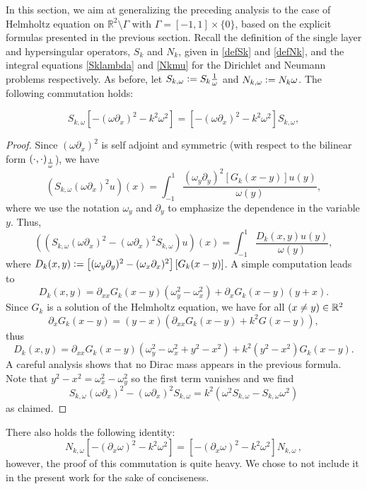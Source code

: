 \documentclass[a4paper]{subfiles}
\begin{document}
In this section, we aim at generalizing the preceding analysis to the case of Helmholtz equation on $\mathbb{R}^2\setminus \Gamma$ 
with $\Gamma = [-1,1]\times\{0\}$, based on the explicit formulas presented in the previous section. Recall the definition of the single layer and 
hypersingular operators, $S_k$ and $N_k$, given in \eqref{defSk} and \eqref{defNk}, and the integral equations \eqref{Sklambda} and 
\eqref{Nkmu} for the Dirichlet and Neumann problems respectively. As before, let $S_{k,\omega} \mathrel{\mathop:}= S_k \frac{1}{\omega}$ and 
$N_{k,\omega} \mathrel{\mathop:}= N_k \omega$. The following commutation holds:	
\begin{theorem}
	\label{commutations}
	\[S_{k,\omega} \left[-(\omega \partial_x)^2 - k^2\omega^2\right] =  \left[-(\omega \partial_x)^2 - k^2\omega^2\right]S_{k,\omega},\]
\end{theorem}
\begin{proof}
	Since $(\omega \partial_x)^2$ is self adjoint and symmetric (with respect to the bilinear form $\left( \cdot,\cdot\right)_{\frac{1}{\omega}}$), we have 
	\[\left(S_{k,\omega} (\omega \partial_x)^2 u\right)(x)= \int_{-1}^{1} \frac{(\omega_y \partial_y)^2 \left[G_k(x-y)\right] u(y)}{\omega(y)},\]
	where we use the notation $\omega_y$ and $\partial_y$ to emphasize the dependence in the variable $y$. 
	Thus, 
	\[\left(\left(S_{k,\omega} (\omega \partial_x)^2 - (\omega \partial_x)^2 S_{k,\omega}\right)u\right)(x) = \int_{-1}^{1} \frac{D_k(x,y)u(y)}{\omega(y)},\]
	where $D_k(x,y) \mathrel{\mathop:}= \left[(\omega_y \partial_y)^2 - (\omega_x \partial_x)^2\right] \left[G_k(x-y)\right]$. 
	A simple computation leads to 
	\[D_k(x,y) = \partial_{xx}G_k(x-y) (\omega^2_y - \omega^2_x) + \partial_x G_k(x-y)(y + x).\]
	Since $G_k$ is a solution of the Helmholtz equation, we have for all $(x \neq y) \in \mathbb{R}^2$ 
	\[\partial_x G_k(x-y) = (y-x)(\partial_{xx}G_k(x-y) + k^2G(x-y)),\]
	thus
	\[D_k(x,y) = \partial_{xx}G_k(x-y)\left(\omega^2_y - \omega_x^2 + y^2 - x^2\right) + k^2(y^2 - x^2)G_k(x-y) . \]
	A careful analysis shows that no Dirac mass appears in the previous formula.
	Note that $y^2 - x^2 = \omega_x^2 - \omega_y^2$ so the first term vanishes and we find
	\[S_{k,\omega} (\omega \partial_x)^2 - (\omega \partial_x)^2 S_{k,\omega} =  k^2\left(\omega^2 S_{k,\omega} -S_{k,\omega} \omega^2 \right)\]
	as claimed.
\end{proof}
There also holds the following identity:
\[N_{k,\omega} \left[-(\partial_x \omega)^2 - k^2\omega^2\right] =  \left[-(\partial_x \omega)^2 - k^2\omega^2\right]N_{k,\omega}\,,\]
however, the proof of this commutation is quite heavy. We chose to not include it in the present work for the sake of conciseness. 
\end{document}

